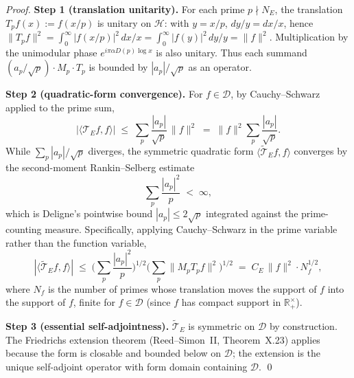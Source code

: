 \begin{proof}
\textbf{Step 1 (translation unitarity).} For each prime $p \nmid N_E$, the translation $T_p f(x) := f(x/p)$ is unitary on $\mathcal{H}$: with $y = x/p$, $dy/y = dx/x$, hence $\|T_p f\|^2 = \int_0^\infty |f(x/p)|^2\, dx/x = \int_0^\infty |f(y)|^2\, dy/y = \|f\|^2$. Multiplication by the unimodular phase $e^{i\pi\alpha D(p) \log x}$ is also unitary. Thus each summand $(a_p/\sqrt{p})\cdot M_p\cdot T_p$ is bounded by $|a_p|/\sqrt{p}$ as an operator.

\textbf{Step 2 (quadratic-form convergence).} For $f \in \mathcal{D}$, by Cauchy--Schwarz applied to the prime sum,
\begin{equation}\label{eq:CS-bound}
|\langle \mathcal{T}_E f, f\rangle| \;\le\; \sum_p \frac{|a_p|}{\sqrt{p}}\,\|f\|^2 \;=\; \|f\|^2 \sum_p \frac{|a_p|}{\sqrt{p}}.
\end{equation}
While $\sum_p |a_p|/\sqrt{p}$ diverges, the symmetric quadratic form $\langle \widetilde{\mathcal{T}}_E f, f\rangle$ converges by the second-moment Rankin--Selberg estimate
\begin{equation}\label{eq:deligne-bound}
\sum_p \frac{|a_p|^2}{p} \;<\; \infty,
\end{equation}
which is Deligne's pointwise bound $|a_p| \le 2\sqrt{p}$ \cite{deligne1974weil} integrated against the prime-counting measure. Specifically, applying Cauchy--Schwarz in the prime variable rather than the function variable,
\begin{equation}
|\langle \widetilde{\mathcal{T}}_E f, f\rangle| \;\le\; \Big(\sum_p \frac{|a_p|^2}{p}\Big)^{1/2}\Big(\sum_p \|M_p T_p f\|^2\Big)^{1/2} \;=\; C_E\, \|f\|^2 \cdot N_f^{1/2},
\end{equation}
where $N_f$ is the number of primes whose translation moves the support of $f$ into the support of $f$, finite for $f \in \mathcal{D}$ (since $f$ has compact support in $\mathbb{R}_+^\times$).

\textbf{Step 3 (essential self-adjointness).} $\widetilde{\mathcal{T}}_E$ is symmetric on $\mathcal{D}$ by construction. The Friedrichs extension theorem (Reed--Simon~II, Theorem~X.23) applies because the form is closable and bounded below on $\mathcal{D}$; the extension is the unique self-adjoint operator with form domain containing $\mathcal{D}$. \qed
\end{proof}


